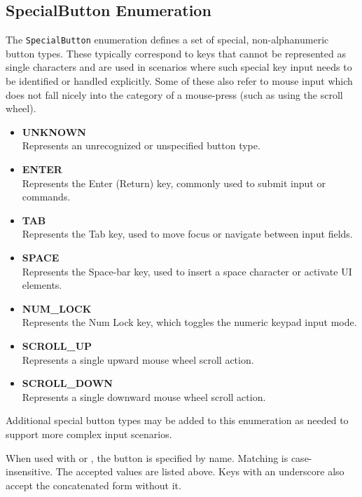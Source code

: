 \subsection{SpecialButton Enumeration} \label{SpecialButton-Enumeration}

The \texttt{SpecialButton} enumeration defines a set of special, non-alphanumeric button types. These typically correspond to keys that cannot be represented as single characters and are used in scenarios where such special key input needs to be identified or handled explicitly. Some of these also refer to mouse input which does not fall nicely into the category of a mouse-press (such as using the scroll wheel).

\begin{itemize}
	\item \textbf{UNKNOWN} \hfill \\
	Represents an unrecognized or unspecified button type.
	
	\item \textbf{ENTER} \hfill \\
	Represents the Enter (Return) key, commonly used to submit input or commands.
	
	\item \textbf{TAB} \hfill \\
	Represents the Tab key, used to move focus or navigate between input fields.
	
	\item \textbf{SPACE} \hfill \\
	Represents the Space-bar key, used to insert a space character or activate UI elements.
	
	\item \textbf{NUM\_LOCK} \hfill \\
	Represents the Num Lock key, which toggles the numeric keypad input mode.
	
	\item \textbf{SCROLL\_UP} \hfill \\
	Represents a single upward mouse wheel scroll action.
	
	\item \textbf{SCROLL\_DOWN} \hfill \\
	Represents a single downward mouse wheel scroll action.
\end{itemize}

\noindent Additional special button types may be added to this enumeration as needed to support more complex input scenarios.

\noindent When used with  or , the button is specified by name. Matching is case-insensitive. The accepted values are listed above. Keys with an underscore also accept the concatenated form without it.


